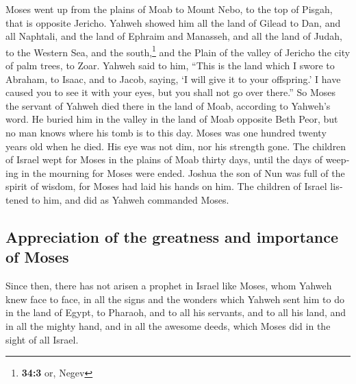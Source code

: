 \begin{paracol}{2}
\begin{otherlanguage}{english}
 Moses went up from the plains of Moab to Mount Nebo, to
the top of Pisgah, that is opposite Jericho. Yahweh showed him all the
land of Gilead to Dan,  and all Naphtali, and the land of
Ephraim and Manasseh, and all the land of Judah, to the Western Sea,
 and the south,\footnote{\textbf{34:3} or, Negev} and the
Plain of the valley of Jericho the city of palm trees, to Zoar.
 Yahweh said to him, ``This is the land which I swore to
Abraham, to Isaac, and to Jacob, saying, `I will give it to your
offspring.' I have caused you to see it with your eyes, but you shall
not go over there.''  So Moses the servant of Yahweh died
there in the land of Moab, according to Yahweh's word.  He
buried him in the valley in the land of Moab opposite Beth Peor, but no
man knows where his tomb is to this day.  Moses was one
hundred twenty years old when he died. His eye was not dim, nor his
strength gone.  The children of Israel wept for Moses in
the plains of Moab thirty days, until the days of weeping in the
mourning for Moses were ended.  Joshua the son of Nun was
full of the spirit of wisdom, for Moses had laid his hands on him. The
children of Israel listened to him, and did as Yahweh commanded Moses.

\hypertarget{appreciation-of-the-greatness-and-importance-of-moses}{%
\subsection{Appreciation of the greatness and importance of
Moses}\label{appreciation-of-the-greatness-and-importance-of-moses}}

 Since then, there has not arisen a prophet in Israel
like Moses, whom Yahweh knew face to face,  in all the
signs and the wonders which Yahweh sent him to do in the land of Egypt,
to Pharaoh, and to all his servants, and to all his land,
 and in all the mighty hand, and in all the awesome
deeds, which Moses did in the sight of all Israel.
\end{otherlanguage} \end{paracol}
